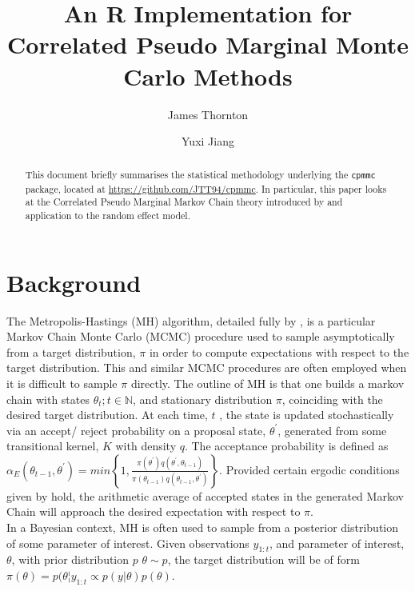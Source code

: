 \documentclass{article}
\title{An R Implementation for Correlated Pseudo Marginal Monte Carlo Methods}
\author{James Thornton \and Yuxi Jiang}
\begin{document}



\maketitle

\begin{abstract}
This document briefly summarises the statistical methodology underlying the \texttt{cpmmc} package, located at \url{https://github.com/JTT94/cpmmc}. In particular, this paper looks at the Correlated Pseudo Marginal Markov Chain theory introduced by \cite{cpmmDeligiannidis2015} and application to the random effect model.
\end{abstract}

\section{Background}

The Metropolis-Hastings (MH) algorithm, detailed fully by \cite{roberts2004}, is a particular Markov Chain Monte Carlo (MCMC) procedure used to sample asymptotically from a target distribution, $\pi$ in order to compute expectations with respect to the target distribution. This and similar MCMC procedures are often employed when it is difficult to sample $ \pi$ directly. The outline of MH is that one builds a markov chain with states $ \theta_t; t \in \mathbb{N}$, and stationary distribution $\pi$, coinciding with the desired target distribution. At each time, $ t $ , the state is updated stochastically via an accept/ reject probability on a proposal state, $\theta^\prime$, generated from some transitional kernel, $K$ with density $q$. The acceptance probability is defined as  $ \alpha_E(\theta_{t-1}, \theta^\prime) = min\left\{1,  \frac{
                \pi(\theta^\prime) q(\theta^\prime, \theta_{t-1})}
                {\pi(\theta_{t-1}) q(\theta_{t-1}, \theta^\prime)}
\right\} $. Provided certain ergodic conditions given by \cite{roberts2004} hold, the arithmetic average of accepted states in the generated Markov Chain will approach the desired expectation with respect to $\pi$. \\

In a Bayesian context, MH is often used to sample from a posterior distribution of some parameter of interest. Given observations $y_{1:t}$, and parameter of interest, $\theta$, with prior distribution $p$ $\theta \sim p$, the target distribution will be of form $\pi (\theta) = p(\theta ¦ y_{1:t} \propto p(y|\theta) p(\theta)$.\\
\end{document}
